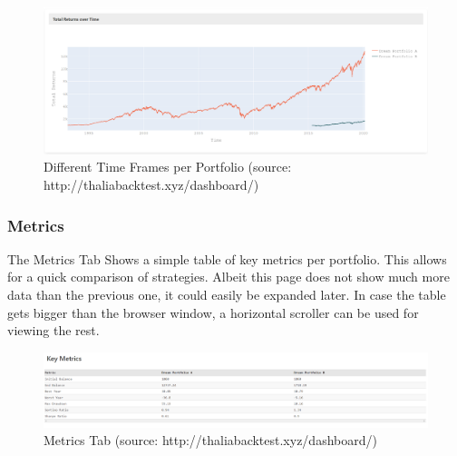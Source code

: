 \documentclass[main.tex]{subfiles}
\begin{document}
\begin{figure}[H]

   \centering

   \includegraphics[width=\textwidth]{08Appendices/081User/081Pictures/differences.png}

   \caption{Different Time Frames per Portfolio (source: http://thaliabacktest.xyz/dashboard/)}

\end{figure}



\subsubsection{Metrics}



The Metrics Tab Shows a simple table of key metrics per portfolio. This allows for a quick comparison of strategies. Albeit this page does not show much more data than the previous one, it could easily be expanded later. In case the table gets bigger than the browser window, a horizontal scroller can be used for viewing the rest. 



\begin{figure}[H]

   \centering

   \includegraphics[width=\textwidth]{08Appendices/081User/081Pictures/metrics.png}

   \caption{Metrics Tab (source: http://thaliabacktest.xyz/dashboard/)}

   \label{metrics}

\end{figure}
\end{document}
